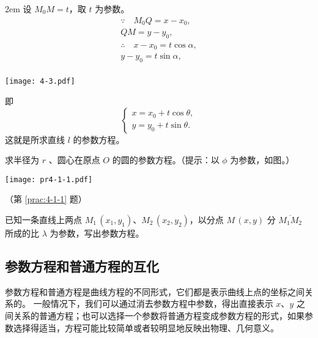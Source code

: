 \medskip\noindent
\begin{minipage}{0.6\linewidth}\parindent2em
  设 $M_0M=t$，取 $t$ 为参数。
  \begin{gather*}
    \because\quad M_0Q=x-x_0,\\
    QM=y-y_0,\\
    \therefore \quad x-x_0=t\cos\alpha,\\
     y-y_0=t\sin\alpha,\\
  \end{gather*}
\end{minipage}\hfill
\begin{minipage}{0.35\linewidth}\centering
\begin{figurehere}
  \texttt{[image: 4-3.pdf]}
  \caption{}\label{fig:4-3}  
\end{figurehere}
\end{minipage}

\medskip\noindent
即
\[\begin{cases}x=x_0+t\cos\theta,\\y=y_0+t\sin\theta.\end{cases}\]
这就是所求直线 $l$ 的参数方程。

\begin{Practice}
  \begin{question}
    \item\label{prac:4-1-1} 求半径为 $r$ 、圆心在原点 $O$ 的圆的参数方程。（提示：以 $\phi$ 为参数，如图。）
    \begin{figurehere}
      \begin{minipage}{\linewidth}\centering
        \texttt{[image: pr4-1-1.pdf]}
        \caption*{（第 \ref{prac:4-1-1} 题）}
      \end{minipage}
    \end{figurehere}
    \item 已知一条直线上两点 $M_1\,(x_1,y_1)$、$M_2\,(x_2,y_2)$，以分点 $M\,(x,y)$ 分 $\overline{M_1M_2}$ 所成的比 $\lambda$ 为参数，写出参数方程。
  \end{question}
\end{Practice}

\subsection{参数方程和普通方程的互化}
参数方程和普通方程是曲线方程的不同形式，它们都是表示曲线上点的坐标之间关系的。
一般情况下，我们可以通过消去参数方程中参数，得出直接表示 $x$、$y$ 之间关系的普通方程；也可以选择一个参数将普通方程变成参数方程的形式，如果参数选择得适当，方程可能比较简单或者较明显地反映出物理、几何意义。


